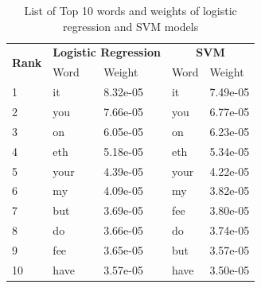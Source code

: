 \documentclass[transmag]{IEEEtran}
\begin{document}
\begin{table}[h]
\begin{center}
\begin{tabular}{|l|ll|ll|}
\hline
\multicolumn{1}{|c|}{\multirow{2}{*}{\textbf{Rank}}} & \multicolumn{2}{c|}{\textbf{Logistic Regression}} & \multicolumn{2}{c|}{\textbf{SVM}}    \\ \cline{2-5} 
\multicolumn{1}{|c|}{}                               & \multicolumn{1}{l|}{Word}        & Weight         & \multicolumn{1}{l|}{Word} & Weight   \\ \hline
1                                                    & \multicolumn{1}{l|}{it}          & 8.32e-05       & \multicolumn{1}{l|}{it}   & 7.49e-05 \\ \hline
2                                                    & \multicolumn{1}{l|}{you}         & 7.66e-05       & \multicolumn{1}{l|}{you}  & 6.77e-05 \\ \hline
3                                                    & \multicolumn{1}{l|}{on}          & 6.05e-05       & \multicolumn{1}{l|}{on}   & 6.23e-05 \\ \hline
4                                                    & \multicolumn{1}{l|}{eth}         & 5.18e-05       & \multicolumn{1}{l|}{eth}  & 5.34e-05 \\ \hline
5                                                    & \multicolumn{1}{l|}{your}        & 4.39e-05       & \multicolumn{1}{l|}{your} & 4.22e-05 \\ \hline
6                                                    & \multicolumn{1}{l|}{my}          & 4.09e-05       & \multicolumn{1}{l|}{my}   & 3.82e-05 \\ \hline
7                                                    & \multicolumn{1}{l|}{but}         & 3.69e-05       & \multicolumn{1}{l|}{fee}  & 3.80e-05 \\ \hline
8                                                    & \multicolumn{1}{l|}{do}          & 3.66e-05       & \multicolumn{1}{l|}{do}   & 3.74e-05 \\ \hline
9                                                    & \multicolumn{1}{l|}{fee}         & 3.65e-05       & \multicolumn{1}{l|}{but}  & 3.57e-05 \\ \hline
10                                                   & \multicolumn{1}{l|}{have}        & 3.57e-05       & \multicolumn{1}{l|}{have} & 3.50e-05 \\ \hline
\end{tabular}
\end{center}
\caption{List of Top 10 words and weights of logistic regression and SVM models}
    \label{tab:top10words}
\end{table}
\end{document}
